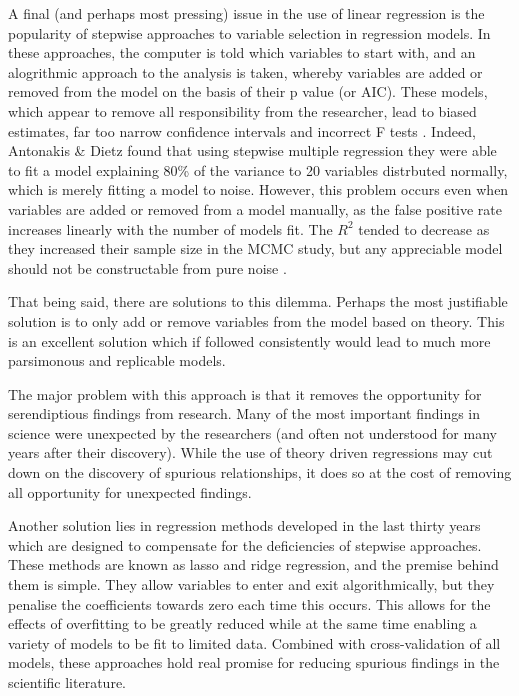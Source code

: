 A final (and perhaps most pressing) issue in the use of linear regression is the popularity of stepwise approaches to variable selection in regression models\cite{antonakis2010looking}. In these approaches, the computer is told which variables to start with, and an alogrithmic approach to the analysis is taken, whereby variables are added or removed from the model on the basis of their p value (or AIC). These models, which appear to remove all responsibility from the researcher, lead to biased estimates, far too narrow confidence intervals and incorrect F tests \cite{antonakis2010looking} \cite{gelman2007data}. Indeed, Antonakis \& Dietz found that using stepwise multiple regression they were able to fit a model explaining 80\% of the variance to 20 variables distrbuted normally, which is merely fitting a model to noise. However, this problem occurs even when variables are added or removed from a model manually, as the false positive rate increases linearly with the number of models fit. The $R^2$ tended to decrease as they increased their sample size in the MCMC study, but any appreciable model should not be constructable from pure noise \cite{antonakis2010looking}.

That being said, there are solutions to this dilemma. Perhaps the most justifiable solution is to only add or remove variables from the model based on theory. This is an excellent solution which if followed consistently would lead to much more parsimonous and replicable models. 

The major problem with this approach is that it removes the opportunity for serendiptious findings from research. Many of the most important findings in science were unexpected by the researchers (and often not understood for many years after their discovery). While the use of theory driven regressions may cut down on the discovery of spurious relationships, it does so at the cost of removing all opportunity for unexpected findings.

Another solution lies in regression methods developed in the last thirty years which are designed to compensate for the deficiencies of stepwise approaches. These methods are known as lasso and ridge regression, and the premise behind them is simple. They allow variables to enter and exit algorithmically, but they penalise the coefficients towards zero each time this occurs\cite{friedman2009elements}. This allows for the effects of overfitting to be greatly reduced while at the same time enabling a variety of models to be fit to limited data. Combined with cross-validation of all models, these approaches hold real promise for reducing spurious findings in the  scientific literature. 

